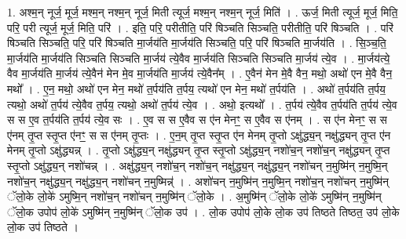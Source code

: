 \documentclass[17pt]{extarticle}
\begin{document}
1. अश्म॒न् नूर्ज॒ मूर्ज॒ मश्म॒न् नश्म॒न् नूर्ज॒ मिती त्यूर्ज॒ मश्म॒न् नश्म॒न् नूर्ज॒ मिति॑ । . ऊर्ज॒ मिती त्यूर्ज॒ मूर्ज॒ मिति॒ परि॒ परी त्यूर्ज॒ मूर्ज॒ मिति॒ परि॑ । . इति॒ परि॒ परीतीति॒ परि॑ षिञ्चति सिञ्चति॒ परीतीति॒ परि॑ षिञ्चति । . परि॑ षिञ्चति सिञ्चति॒ परि॒ परि॑ षिञ्चति मा॒र्जय॑ति मा॒र्जय॑ति सिञ्चति॒ परि॒ परि॑ षिञ्चति मा॒र्जय॑ति । . सि॒ञ्च॒ति॒ मा॒र्जय॑ति मा॒र्जय॑ति सिञ्चति सिञ्चति मा॒र्जय॑ त्ये॒वैव मा॒र्जय॑ति सिञ्चति सिञ्चति मा॒र्जय॑ त्ये॒व । . मा॒र्जय॑त्ये॒ वैव मा॒र्जय॑ति मा॒र्जय॑ त्ये॒वैन॑ मेन मे॒व मा॒र्जय॑ति मा॒र्जय॑ त्ये॒वैन᳚म् । . ए॒वैन॑ मेन मे॒वै वैन॒ मथो॒ अथो॑ एन मे॒वै वैन॒ मथो᳚ । . ए॒न॒ मथो॒ अथो॑ एन मेन॒ मथो॑ त॒र्पय॑ति त॒र्पय॒ त्यथो॑ एन मेन॒ मथो॑ त॒र्पय॑ति । . अथो॑ त॒र्पय॑ति त॒र्पय॒ त्यथो॒ अथो॑ त॒र्पय॑ त्ये॒वैव त॒र्पय॒ त्यथो॒ अथो॑ त॒र्पय॑ त्ये॒व । . अथो॒ इत्यथो᳚ । . त॒र्पय॑ त्ये॒वैव त॒र्पय॑ति त॒र्पय॑ त्ये॒व स स ए॒व त॒र्पय॑ति त॒र्पय॑ त्ये॒व सः । . ए॒व स स ए॒वैव स ए॑न मेनꣳ॒॒ स ए॒वैव स ए॑नम् । . स ए॑न मेनꣳ॒॒ स स ए॑नम् तृ॒प्त स्तृ॒प्त ए॑नꣳ॒॒ स स ए॑नम् तृ॒प्तः । . ए॒न॒म् तृ॒प्त स्तृ॒प्त ए॑न मेनम् तृ॒प्तो ऽक्षु॑द्ध्य॒न् नक्षु॑द्ध्यन् तृ॒प्त ए॑न मेनम् तृ॒प्तो ऽक्षु॑द्ध्यन्न् । . तृ॒प्तो ऽक्षु॑द्ध्य॒न् नक्षु॑द्ध्यन् तृ॒प्त स्तृ॒प्तो ऽक्षु॑द्ध्य॒न् नशो॑च॒न् नशो॑च॒न् नक्षु॑द्ध्यन् तृ॒प्त स्तृ॒प्तो ऽक्षु॑द्ध्य॒न् नशो॑चन्न् । . अक्षु॑द्ध्य॒न् नशो॑च॒न् नशो॑च॒न् नक्षु॑द्ध्य॒न् नक्षु॑द्ध्य॒न् नशो॑चन् न॒मुष्मि॑न् न॒मुष्मि॒न् नशो॑च॒न् नक्षु॑द्ध्य॒न् नक्षु॑द्ध्य॒न् नशो॑चन् न॒मुष्मिन्न्॑ । . अशो॑चन् न॒मुष्मि॑न् न॒मुष्मि॒न् नशो॑च॒न् नशो॑चन् न॒मुष्मि॑न् ॅलो॒के लो॒के॑ ऽमुष्मि॒न् नशो॑च॒न् नशो॑चन् न॒मुष्मि॑न् ॅलो॒के । . अ॒मुष्मि॑न् ॅलो॒के लो॒के॑ ऽमुष्मि॑न् न॒मुष्मि॑न् ॅलो॒क उपोप॑ लो॒के॑ ऽमुष्मि॑न् न॒मुष्मि॑न् ॅलो॒क उप॑ । . लो॒क उपोप॑ लो॒के लो॒क उप॑ तिष्ठते तिष्ठत॒ उप॑ लो॒के लो॒क उप॑ तिष्ठते । \newline
\end{document}
